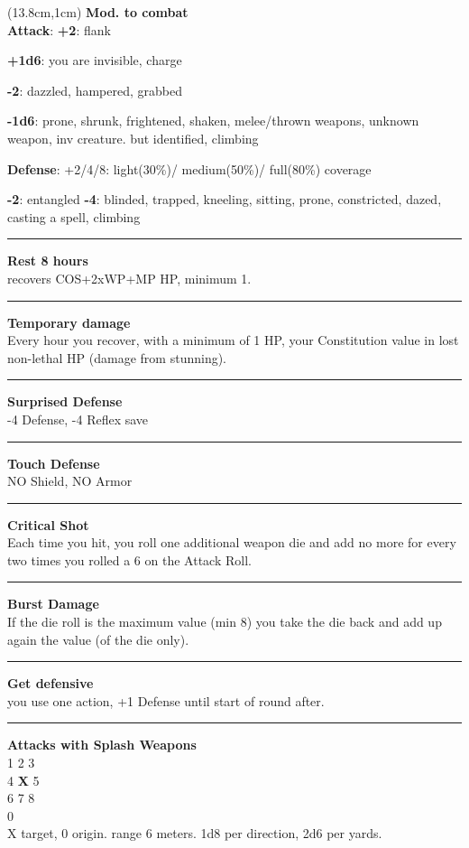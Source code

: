 \documentclass[a4paper,12 pt,openany]{book}
\newcommand{\linex}{\rule{\textwidth}{0.4pt}}
\begin{document}
\begin{textblock*}{6.2cm}(13.8cm,1cm) %
\textbf{Mod. to combat}\\
\textbf{Attack}:
\textbf{+2}: flank

\textbf{+1d6}: you are invisible, charge

\textbf{-2}: dazzled, hampered, grabbed

\textbf{-1d6}: prone, shrunk, frightened, shaken, melee/thrown weapons, unknown weapon, inv creature. but identified, climbing

\textbf{Defense}: +2/4/8: light(30\%)/ medium(50\%)/ full(80\%) coverage

\textbf{-2}: entangled \textbf{-4}: blinded, trapped, kneeling, sitting, prone, constricted, dazed, casting a spell, climbing
\linex

\textbf{Rest 8 hours} \\recovers COS+2xWP+MP HP, minimum 1.

\linex

\textbf{Temporary damage}\\ Every hour you recover, with a minimum of 1 HP, your Constitution value in lost non-lethal HP (damage from stunning).

\linex

\textbf{Surprised Defense}\\ -4 Defense, -4 Reflex save

\linex

\textbf{Touch Defense}\\ NO Shield, NO Armor

\linex

\textbf{Critical Shot}\\
Each time you hit, you roll one additional weapon die and add no more for every two times you rolled a 6 on the Attack Roll.

\linex

\textbf{Burst Damage}\\
If the die roll is the maximum value (min 8) you take the die back and add up again the value (of the die only).

\linex

\textbf{Get defensive}\\
you use one action, +1 Defense until start of round after.


\linex

\textbf{Attacks with Splash Weapons}\\
1 2 3\\
4 \textbf{X} 5\\
6 7 8\\
0\\
X target, 0 origin. range 6 meters. 1d8 per direction, 2d6 per yards.


\end{textblock*}
\end{document}
